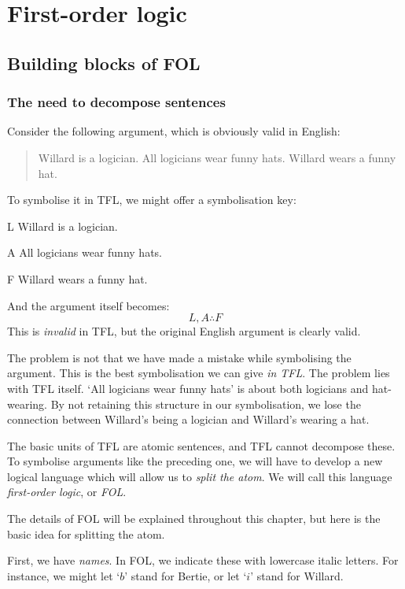 \part{First-order logic}
\label{ch.FOL}
\chapter{Building blocks of FOL}\label{s:FOLBuildingBlocks}

\section{The need to decompose sentences}
Consider the following argument, which is obviously valid in English:
\begin{quote}
\label{willard1}
Willard is a logician. All logicians wear funny hats. \therefore Willard wears a funny hat.
\end{quote}
To symbolise it in TFL, we might offer a symbolisation key:
\begin{ekey}
\item[L] Willard is a logician.
\item[A] All logicians wear funny hats.
\item[F] Willard wears a funny hat.
\end{ekey}
And the argument itself becomes:
$$L, A \therefore F$$
This is \emph{invalid} in TFL, but the original English argument is clearly valid.

The problem is not that we have made a mistake while symbolising the argument. This is the best symbolisation we can give \emph{in TFL}. The problem lies with TFL itself. `All logicians wear funny hats' is about both logicians and hat-wearing. By not retaining this structure in our symbolisation, we lose the connection between Willard's being a logician and Willard's wearing a hat.

The basic units of TFL are atomic sentences, and TFL cannot decompose these. To symbolise arguments like the preceding one, we will have to develop a new logical language which will allow us to \emph{split the atom}. We will call this language \emph{first-order logic}, or \emph{FOL}. 

The details of FOL will be explained throughout this chapter, but here is the basic idea for splitting the atom.

First, we have \emph{names}. In FOL, we indicate these with lowercase italic letters. For instance, we might let `$b$' stand for Bertie, or let `$i$' stand for Willard.


